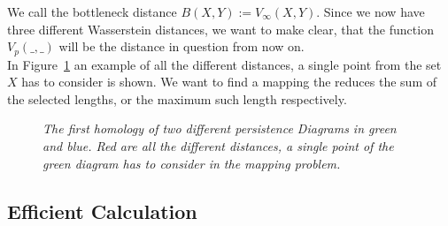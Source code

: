 \documentclass[11pt, a4paper, UKenglish]{article}
\begin{document}
    We call the bottleneck distance $B(X,Y) := V_\infty(X,Y)$.
    Since we now have three different Wasserstein distances, we want to make clear, that the function $V_p(\_,\_)$ will be the distance in question from now on.\\
    In Figure\ \ref{distances} an example of all the different distances, a single point from the set $X$ has to consider is shown.
    We want to find a mapping the reduces the sum of the selected lengths, or the maximum such length respectively.
    \begin{figure}
        \centering
        \caption{\textit{The first homology of two different persistence Diagrams in green and blue.
        Red are all the different distances, a single point of the green diagram has to consider in the mapping problem.}}
        \label{distances}
    \end{figure}

    \subsection{Efficient Calculation}\label{subsec:efficient-calculation}
\end{document}
